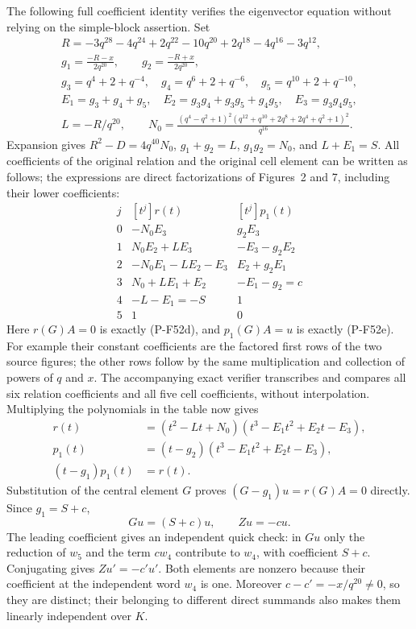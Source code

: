 \documentclass[11pt,a4paper]{article}
\begin{document}
The following full coefficient identity verifies the eigenvector
equation without relying on the simple-block assertion. Set
\[
 \begin{gathered}
 R=-3q^{28}-4q^{24}+2q^{22}-10q^{20}+2q^{18}-4q^{16}-3q^{12},\\
 g_1=\frac{-R-x}{2q^{20}},\qquad
 g_2=\frac{-R+x}{2q^{20}},\\
 g_3=q^4+2+q^{-4},\quad g_4=q^6+2+q^{-6},\quad
 g_5=q^{10}+2+q^{-10},\\
 E_1=g_3+g_4+g_5,\quad E_2=g_3g_4+g_3g_5+g_4g_5,\quad
 E_3=g_3g_4g_5,\\
 L=-R/q^{20},\qquad
 N_0=\frac{(q^4-q^2+1)^2
             (q^{12}+q^{10}+2q^8+2q^4+q^2+1)^2}{q^{16}}.
 \end{gathered}                                                 \tag{P-F52f1}
\]
Expansion gives $R^2-D=4q^{40}N_0$, $g_1+g_2=L$,
$g_1g_2=N_0$, and $L+E_1=S$. All coefficients of the
original relation and the original cell element can be written
as follows; the expressions are direct factorizations of
Figures~2 and 7, including their lower coefficients:
\[
\begin{array}{c|c|c}
 j&[t^j]r(t)&[t^j]p_1(t)\\ \hline
 0&-N_0E_3&g_2E_3\\
 1&N_0E_2+LE_3&-E_3-g_2E_2\\
 2&-N_0E_1-LE_2-E_3&E_2+g_2E_1\\
 3&N_0+LE_1+E_2&-E_1-g_2=c\\
 4&-L-E_1=-S&1\\
 5&1&0
\end{array}                                                     \tag{P-F52f2}
\]
Here $r(G)A=0$ is exactly (P-F52d), and $p_1(G)A=u$
is exactly (P-F52e). For example their constant coefficients
are the factored first rows of the two source figures; the
other rows follow by the same multiplication and collection
of powers of $q$ and $x$. The accompanying exact verifier
transcribes and compares all six relation coefficients and
all five cell coefficients, without interpolation.
Multiplying the polynomials in the table now gives
\[
 \begin{split}
 r(t)&=(t^2-Lt+N_0)(t^3-E_1t^2+E_2t-E_3),\\
 p_1(t)&=(t-g_2)(t^3-E_1t^2+E_2t-E_3),\\
                 (t-g_1)p_1(t)&=r(t).
 \end{split}                                                    \tag{P-F52f3}
\]
Substitution of the central element $G$ proves
$(G-g_1)u=r(G)A=0$ directly. Since $g_1=S+c$,
\[
                 Gu=(S+c)u,\qquad Zu=-cu.                     \tag{P-F52f}
\]
The leading coefficient gives an independent quick check:
in $Gu$ only the reduction of $w_5$ and the term $cw_4$
contribute to $w_4$, with coefficient $S+c$.
Conjugating gives $Zu'=-c'u'$. Both elements are nonzero because
their coefficient at the independent word $w_4$ is one.
Moreover $c-c'=-x/q^{20}\ne0$, so they are distinct; their
belonging to different direct summands also makes them
linearly independent over $K$.
\end{document}
